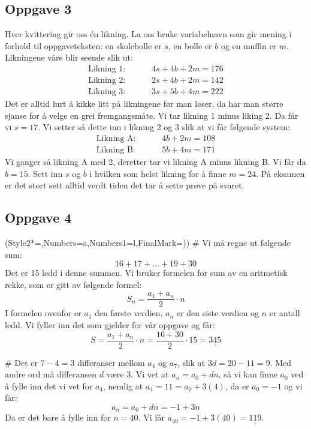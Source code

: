 \documentclass[12pt, a4paper]
{article}						%
\def\answer#1{\underline{\underline{#1}}}
\begin{document}
\subsection*{Oppgave 3}
Hver kvittering gir oss én likning. La oss bruke variabelnavn som gir mening i forhold til oppgaveteksten: en skolebolle er $s$, en bolle er $b$ og en muffin er $m$. Likningene våre blir seende slik ut:
\begin{align*}
	\text{Likning 1:   }\qquad& 4s + 4b +2m = 176 \\
	\text{Likning 2:   }\qquad& 2s + 4b +2m = 142 \\
	\text{Likning 3:   }\qquad& 3s + 5b +4m = 222 
\end{align*}
Det er alltid lurt å kikke litt på likningene før man løser, da har man større sjanse for å velge en grei fremgangsmåte.
Vi tar likning 1 minus liking 2. Da får vi \answer{$s = 17$}. Vi setter så dette inn i likning 2 og 3 slik at vi får følgende system:
\begin{align*}
\text{Likning A:   }\qquad& 4b +2m = 108 \\
\text{Likning B:   }\qquad& 5b + 4m = 171 
\end{align*}
Vi ganger så likning A med 2, deretter tar vi likning A minus likning B. Vi får da \answer{$b = 15$}. Sett inn $s$ og $b$ i hvilken som helst likning for å finne \answer{$m = 24$}. På eksamen er det stort sett alltid verdt tiden det tar å sette prøve på svaret.

\subsection*{Oppgave 4}
\begin{easylist}[enumerate]
	\ListProperties(Style2*=,Numbers=a,Numbers1=l,FinalMark={)})
	# Vi må regne ut følgende sum:
	\begin{equation*}
		16 + 17 + \dots + 19 + 30
	\end{equation*}
	Det er 15 ledd i denne summen. Vi bruker formelen for sum av en aritmetisk rekke, som er gitt av følgende formel:
	\begin{equation}
	\label{eqn:arit}
		S_n = \frac{a_1 + a_n}{2} \cdot n
	\end{equation}
	I formelen ovenfor er $a_1$ den første verdien, $a_n$ er den siste verdien og $n$ er antall ledd. Vi fyller inn det som gjelder for vår oppgave og får:
	\begin{equation*}
	S = \frac{a_1 + a_n}{2} \cdot n = \frac{16 + 30}{2} \cdot 15 = \answer{345}
	\end{equation*}
	
	# Det er $7-4 = 3$ differanser mellom $a_4$ og $a_7$, slik at $3d = 20-11 = 9$.
	Med andre ord må differansen $d$ være $3$. Vi vet at $a_n = a_0 + dn$, så vi kan finne $a_0$ ved å fylle inn det vi vet for $a_4$, nemlig at $a_4 = 11 = a_0 + 3(4)$, da er $a_0 = -1$ og vi får:
	\begin{equation*}
		a_n = a_0 + dn = -1 + 3n
	\end{equation*}
	Da er det bare å fylle inn for $n = 40$. Vi får $a_{40} = -1 + 3(40) = \answer{119}$.
\end{easylist}
\end{document}
